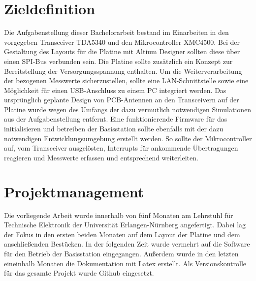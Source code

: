 \section{Zieldefinition}
Die Aufgabenstellung dieser Bachelorarbeit bestand im Einarbeiten in den vorgegeben Transceiver TDA5340 und den Mikrocontroller XMC4500. Bei der Gestaltung des Layouts für die Platine mit Altium Designer sollten diese über einen SPI-Bus verbunden sein. Die Platine sollte zusätzlich ein Konzept zur Bereitstellung der Versorgungsspannung enthalten. Um die Weiterverarbeitung der bezogenen Messwerte sicherzustellen, sollte eine LAN-Schnittstelle sowie eine Möglichkeit für einen USB-Anschluss zu einem PC integriert werden.
Das ursprünglich geplante Design von PCB-Antennen an den Transceivern auf der Platine wurde wegen des Umfangs der dazu vermutlich notwendigen Simulationen aus der Aufgabenstellung entfernt.
Eine funktionierende Firmware für das initialisieren und betreiben der Basisstation sollte ebenfalls mit der dazu notwendigen Entwicklungsumgebung erstellt werden. So sollte der Mikrocontroller auf, vom Transceiver ausgelösten, Interrupts für ankommende Übertragungen reagieren und Messwerte erfassen und entsprechend weiterleiten.


\section{Projektmanagement}
Die vorliegende Arbeit wurde innerhalb von fünf Monaten am Lehrstuhl für Technische Elektronik der Universität Erlangen-Nürnberg angefertigt. Dabei lag der Fokus in den ersten beiden Monaten auf dem Layout der Platine und dem anschließenden Bestücken. In der folgenden Zeit wurde vermehrt auf die Software für den Betrieb der Basisstation eingegangen. Außerdem wurde in den letzten eineinhalb Monaten die Dokumentation mit Latex erstellt. Als Versionskontrolle für das gesamte Projekt wurde Github eingesetzt.
